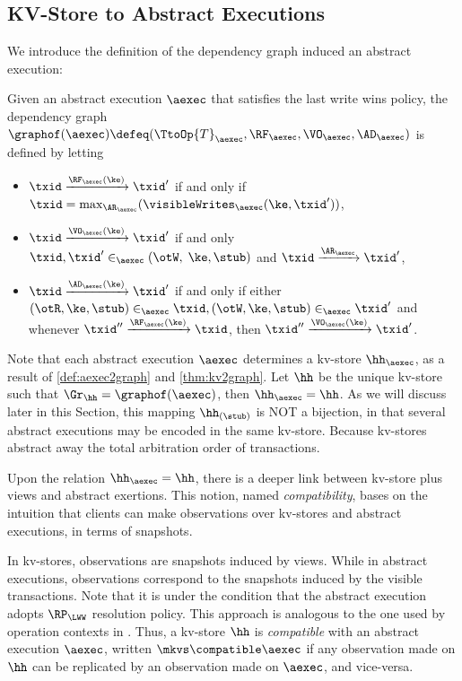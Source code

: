 \subsection{KV-Store to Abstract Executions}
\label{app:aexec2kv}
\label{sec:thm:aexec2kv-compatible-proof}

We introduce the definition of the dependency graph induced an abstract execution:

\begin{definition}
\label{def:aexec2graph}
Given an abstract execution $\aexec$ that satisfies the last write wins policy,
the dependency graph $\graphof(\aexec) \defeq (\TtoOp{T}_{\aexec}, \RF_{\aexec}, 
\VO_{\aexec}, \AD_{\aexec})$ is defined by letting
\begin{itemize}
\item $\txid \xrightarrow{\RF_{\aexec}(\ke)} \txid'$ if and only if 
$\txid = \max_{\AR_{\aexec}}(\visibleWrites_{\aexec}(\ke, \txid'))$, 
\item $\txid \xrightarrow{\VO_{\aexec}(\ke)} \txid'$ if and only 
$\txid, \txid' \in_{\aexec} (\otW, \;\ke, \stub)$ 
and $\txid \xrightarrow{\AR_{\aexec}} \txid'$,
\item $\txid \xrightarrow{\AD_{\aexec}(\ke)} \txid'$ if and only if either 
$(\otR, \ke, \stub) \in_{\aexec} \txid, (\otW, \ke, \stub) \in_{\aexec} \txid'$ and 
whenever $\txid'' \xrightarrow{\RF_{\aexec}(\ke)} \txid$, 
then $\txid'' \xrightarrow{\VO_{\aexec}(\ke)} \txid'$.
\end{itemize}
\end{definition}

Note that each abstract execution $\aexec$ determines a kv-store $\hh_{\aexec}$,
as a result of \cref{def:aexec2graph} and \cref{thm:kv2graph}. 
Let $\hh$ be the unique kv-store such that $\Gr_{\hh} = \graphof(\aexec)$, then $\hh_{\aexec} = \hh$. 
As we will discuss later in this Section,
this mapping $\hh_{(\stub)}$ is NOT a bijection, 
in that several abstract executions may be encoded in the same kv-store.
Because kv-stores abstract away the total arbitration order of transactions.

Upon the relation \( \hh_{\aexec} = \hh \),
there is a deeper link between kv-store plus views and abstract exertions.
This notion, named \emph{compatibility}, bases on the intuition that 
clients can make observations over kv-stores and abstract executions, in terms of snapshots.

In kv-stores, observations are snapshots induced by views. 
While in abstract executions, observations correspond to the snapshots induced by the visible transactions.
Note that it is under the condition that the abstract execution adopts $\RP_{\LWW}$ resolution policy.
This approach is analogous to the one used by operation contexts in \cite{repldatatypes}.
Thus, a kv-store $\hh$ is \emph{compatible} with an abstract execution $\aexec$, written \( \mkvs \compatible \aexec \)
if any observation made on $\hh$ can be replicated by an observation made on $\aexec$, and vice-versa. 

